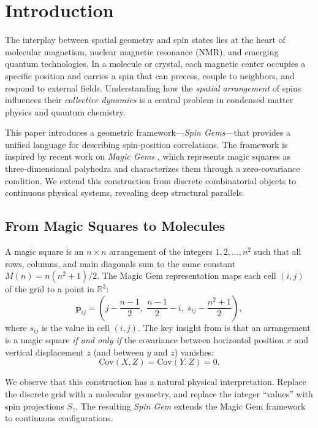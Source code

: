 \section{Introduction}
\label{sec:introduction}

The interplay between spatial geometry and spin states lies at the heart of molecular magnetism, nuclear magnetic resonance (NMR), and emerging quantum technologies. In a molecule or crystal, each magnetic center occupies a specific position and carries a spin that can precess, couple to neighbors, and respond to external fields. Understanding how the \emph{spatial arrangement} of spins influences their \emph{collective dynamics} is a central problem in condensed matter physics and quantum chemistry.

This paper introduces a geometric framework---\emph{Spin Gems}---that provides a unified language for describing spin-position correlations. The framework is inspired by recent work on \emph{Magic Gems} \cite{magic_gems_2025}, which represents magic squares as three-dimensional polyhedra and characterizes them through a zero-covariance condition. We extend this construction from discrete combinatorial objects to continuous physical systems, revealing deep structural parallels.

\subsection{From Magic Squares to Molecules}

A magic square is an $n \times n$ arrangement of the integers $1, 2, \ldots, n^2$ such that all rows, columns, and main diagonals sum to the same constant $M(n) = n(n^2+1)/2$. The Magic Gem representation maps each cell $(i, j)$ of the grid to a point in $\mathbb{R}^3$:
\begin{equation}
\mathbf{p}_{ij} = \left( j - \frac{n-1}{2}, \; \frac{n-1}{2} - i, \; s_{ij} - \frac{n^2+1}{2} \right),
\end{equation}
where $s_{ij}$ is the value in cell $(i, j)$. The key insight from \cite{magic_gems_2025} is that an arrangement is a magic square \emph{if and only if} the covariance between horizontal position $x$ and vertical displacement $z$ (and between $y$ and $z$) vanishes:
\begin{equation}
\text{Cov}(X, Z) = \text{Cov}(Y, Z) = 0.
\end{equation}

We observe that this construction has a natural physical interpretation. Replace the discrete grid with a molecular geometry, and replace the integer ``values'' with spin projections $S_z$. The resulting \emph{Spin Gem} extends the Magic Gem framework to continuous configurations.

